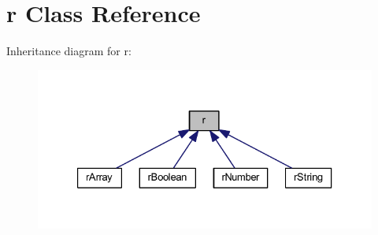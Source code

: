 \hypertarget{class_pierce_moore_1_1_ruby_p_h_p_1_1r}{\section{r Class Reference}
\label{class_pierce_moore_1_1_ruby_p_h_p_1_1r}
}


Inheritance diagram for r\-:
\nopagebreak
\begin{figure}[H]
\begin{center}
\leavevmode
\includegraphics[width=329pt]{class_pierce_moore_1_1_ruby_p_h_p_1_1r__inherit__graph}
\end{center}
\end{figure}
